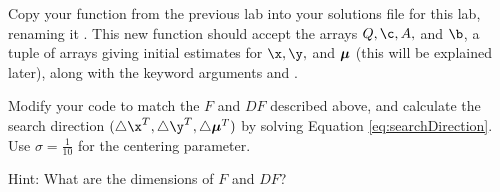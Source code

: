 \begin{problem}
Copy your  function from the previous lab into your solutions file for this lab, renaming it .
This new function should accept the arrays $Q, \c, A,$ and $\b$, a tuple of arrays  giving initial estimates for $\x, \y,$ and $\boldsymbol{\mu}$ (this will be explained later), along with the keyword arguments  and .

Modify your code to match the $F$ and $DF$ described above, and calculate the search direction $(\triangle \x^T, \triangle \y^T, \triangle \Mu^T)$ by solving Equation \ref{eq:searchDirection}.
Use $\sigma = \frac{1}{10}$ for the centering parameter.

Hint: What are the dimensions of $F$ and $DF$?
\end{problem}


